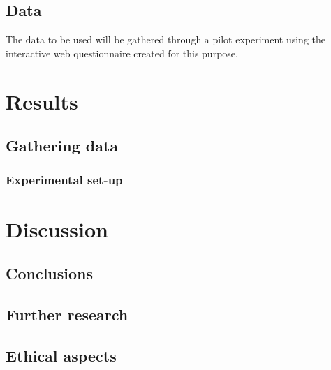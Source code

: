 \documentclass[twoside]{uva-inf-bachelor-thesis}
\begin{document}
\section{Data}
The data to be used will be gathered through a pilot experiment using the interactive web questionnaire created for this purpose. 


\chapter{Results}
\section{Gathering data}
\subsection{Experimental set-up}


\chapter{Discussion}
\section{Conclusions}
\section{Further research}
\section{Ethical aspects}


\printbibliography
{}
\end{document}

